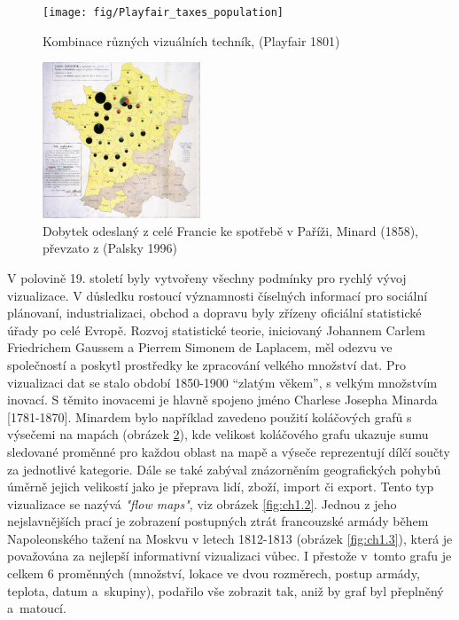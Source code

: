 \documentclass[12pt,]{article}
\begin{document}
\begin{figure}[H]

{\centering \texttt{[image: fig/Playfair\_taxes\_population]} 

}

\caption{\label{fig:ch1.0} Kombinace různých vizuálních techník, (Playfair 1801)}\label{fig:playfair}
\end{figure}

\newpage

\begin{figure}
    \centering
    \includegraphics[width=0.42\textwidth]{fig/Minard_1858}
    \vspace{-5pt}
    \caption{Dobytek odeslaný z celé Francie ke spotřebě v Paříži, Minard (1858), převzato z (Palsky 1996)}
    \label{fig:ch1.1}
\end{figure}

\qquad V polovině 19. století byly vytvořeny všechny podmínky pro rychlý
vývoj vizualizace. V důsledku rostoucí významnosti číselných informací
pro sociální plánovaní, industrializaci, obchod a dopravu byly zřízeny
oficiální statistické úřady po celé Evropě. Rozvoj statistické teorie,
iniciovaný Johannem Carlem Friedrichem Gaussem a Pierrem Simonem de
Laplacem, měl odezvu ve společností a poskytl prostředky ke zpracování
velkého množství dat. Pro vizualizaci dat se stalo období
\mbox{1850-1900} \enquote{zlatým věkem}, s velkým množstvím inovací. S
těmito inovacemi je hlavně spojeno jméno Charlese Josepha Minarda
{[}1781-1870{]}. Minardem bylo například zavedeno použití koláčových
grafů s výsečemi na mapách (obrázek \ref{fig:ch1.1}), kde velikost
koláčového grafu ukazuje sumu sledované proměnné pro každou oblast na
mapě a výseče reprezentují dílčí součty za jednotlivé kategorie. Dále se
také zabýval znázorněním geografických pohybů úměrně jejich velikostí
jako je přeprava lidí, zboží, import či export. Tento typ vizualizace se
nazývá \textit{"flow maps"}, viz obrázek \ref{fig:ch1.2}. Jednou z jeho
nejslavnějších prací je zobrazení postupných ztrát francouzské armády
během Napoleonského tažení na Moskvu v letech 1812-1813 (obrázek
\ref{fig:ch1.3}), která je považována za nejlepší informativní
vizualizaci vůbec. I přestože v~tomto grafu je celkem 6 proměnných
(množství, lokace ve dvou rozměrech, postup armády, teplota, datum
a~skupiny), podařilo vše zobrazit tak, aniž by graf byl přeplněný
a~\mbox{matoucí.}
\end{document}
